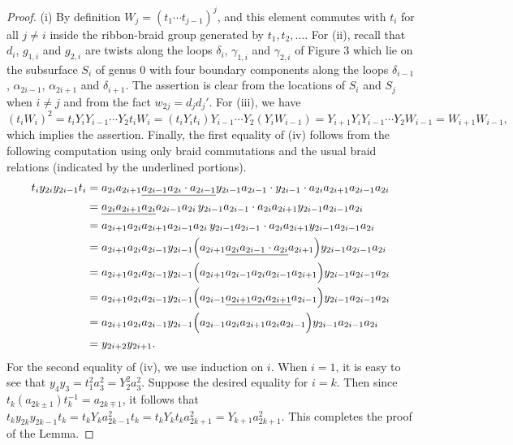 \documentclass[a4paper,10pt,reqno]{amsart}
\begin{document}
\begin{proof}
(i) By definition $W_j=(t_1\cdots t_{j-1})^j$, and this element commutes
with $t_i$ for all $j\ne i$ inside the ribbon-braid group generated by
$t_1,t_2,\dots$. 
For (ii), recall that $d_i$, $g_{1,i}$ and $g_{2,i}$
are twists along the loops $\delta_i$, $\gamma_{1,i}$ and 
$\gamma_{2,i}$ of Figure 3 which lie on the subsurface
$S_i$ of genus $0$ with four boundary components along the loops $\delta_{i-1}$, $\alpha_{2i-1}$,
$\alpha_{2i+1}$ and $\delta_{i+1}$. 
The assertion is clear from the locations of $S_i$
and $S_j$ when $i\ne j$ and from the fact
$w_{2j}=d_jd_j'$.
For (iii), we have 
$$(t_iW_i)^2=t_iY_iY_{i-1}\cdots Y_2t_iW_i
=(t_iY_it_i)Y_{i-1}\cdots Y_2(Y_iW_{i-1})
=Y_{i+1}Y_iY_{i-1}\cdots Y_2W_{i-1}
=W_{i+1}W_{i-1},$$
which implies the assertion.
Finally, the first equality of (iv) follows from the following computation
using only braid commutations and the usual braid relations (indicated
by the underlined portions).
\begin{align*}
t_iy_{2i}y_{2i-1}t_i &= 
a_{2i}a_{2i+1}\underline{a_{2i-1}
a_{2i}\cdot
a_{2i-1}}y_{2i-1}a_{2i-1}\cdot
y_{2i-1}\cdot
a_{2i}a_{2i+1}a_{2i-1}a_{2i}
\\
&=\underline{a_{2i}a_{2i+1}a_{2i}}
a_{2i-1}a_{2i}\,
y_{2i-1}a_{2i-1}\cdot
a_{2i}a_{2i+1}y_{2i-1}a_{2i-1}a_{2i}
\\
&=a_{2i+1}a_{2i}a_{2i+1}
a_{2i-1}a_{2i}\,
y_{2i-1}
a_{2i-1}\cdot
a_{2i}a_{2i+1}y_{2i-1}a_{2i-1}a_{2i}
\\
&=a_{2i+1}a_{2i}a_{2i-1}y_{2i-1}
\Bigl(a_{2i+1}\underline{a_{2i} a_{2i-1}\cdot a_{2i}}a_{2i+1}\Bigr)
y_{2i-1}a_{2i-1}a_{2i}\\
&=a_{2i+1}a_{2i}a_{2i-1}y_{2i-1}
\Bigl(a_{2i+1}a_{2i-1} a_{2i}a_{2i-1}a_{2i+1}\Bigr)
y_{2i-1}a_{2i-1}a_{2i}\\
&=a_{2i+1}a_{2i}a_{2i-1}y_{2i-1}
\Bigl(a_{2i-1}\underline{a_{2i+1} a_{2i}a_{2i+1}}a_{2i-1}\Bigr)
y_{2i-1}a_{2i-1}a_{2i}\\
&=a_{2i+1}a_{2i}a_{2i-1}y_{2i-1}\Bigl(a_{2i-1}a_{2i}a_{2i+1}a_{2i}
a_{2i-1}\Bigr)
y_{2i-1}a_{2i-1}a_{2i}\\
&=y_{2i+2}y_{2i+1}.
\end{align*}
For the second equality of (iv), we use induction on $i$. When $i=1$, 
it is easy to see that $y_4y_3=t_1^2a_3^2=Y_2^2a_3^2$. 
Suppose the desired equality for $i=k$.
Then since $t_k(a_{2k\pm 1})t_k^{-1}=a_{2k\mp 1}$, it follows that 
$t_ky_{2k}y_{2k-1}t_k=t_kY_{k}a_{2k-1}^2t_k=t_kY_{k}t_ka_{2k+1}^2
=Y_{k+1}a_{2k+1}^2$.
This completes the proof of the Lemma.
\end{proof}
\end{document}
